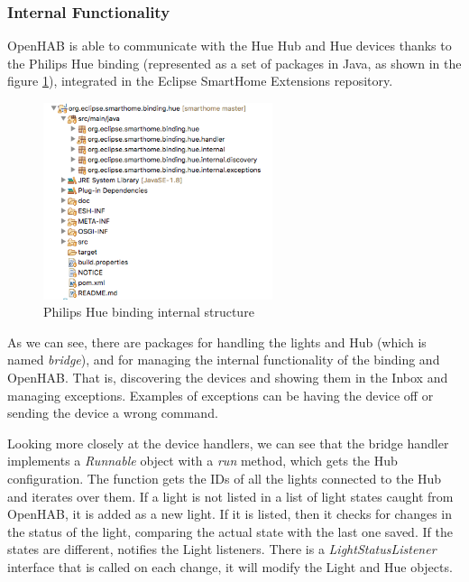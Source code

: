\subsubsection{Internal Functionality}
OpenHAB is able to communicate with the Hue Hub and Hue devices thanks to the Philips Hue binding (represented as a set of packages 
in Java, as shown in the figure \ref{fig:hue-binding-structure}), integrated in the Eclipse SmartHome Extensions repository. 

\begin{figure}
	\centering
	\includegraphics[width=0.6\textwidth]{images/Chapter_06/hue-binding-structure.png}
	\caption{Philips Hue binding internal structure}
	\label{fig:hue-binding-structure}
\end{figure}

As we can see, there are packages for handling the lights and Hub (which is named \textit{bridge}), and for managing the internal 
functionality of the binding and OpenHAB. That is, discovering the devices and showing them in the Inbox and managing exceptions. 
Examples of exceptions can be having the device off or sending the device a wrong command.

Looking more closely at the device handlers, we can see that the bridge handler implements a \textit{Runnable} object with a 
\textit{run} method, which gets the Hub configuration. The function gets the IDs of all the lights connected to the Hub and iterates 
over them. If a light is not listed in a list of light states caught from OpenHAB, it is added as a new light. If it is listed, then 
it checks for changes in the status of the light, comparing the actual state with the last one saved. If the states are different, 
notifies the Light listeners. There is a \textit{LightStatusListener} interface that is called on each change, it will modify the 
Light and Hue objects.

